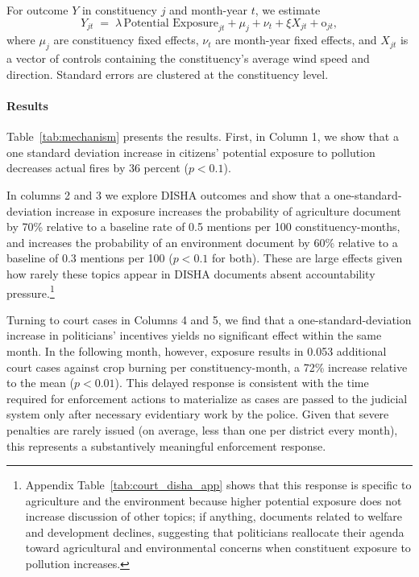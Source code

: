 \documentclass[12pt]{article}
\providecommand{\omicron}{\mathrm{o}}
\begin{document}
For outcome $Y$ in constituency $j$ and month-year $t$, we estimate
\begin{equation}
Y_{jt} \;=\; \lambda \, \text{Potential Exposure}_{jt} + \mu_j + \nu_t + \xi X_{jt} + \omicron_{jt},
\label{eq:mech}
\end{equation}
where $\mu_j$ are constituency fixed effects, $\nu_t$ are month-year fixed effects, and $X_{jt}$ is a vector of controls containing the constituency's average wind speed and direction. Standard errors are clustered at the constituency level.



\paragraph{Results}

Table~\ref{tab:mechanism} presents the results. First, in Column 1, we show that a one standard deviation increase in citizens' potential exposure to pollution decreases actual fires by 36 percent ($p<0.1$). 

In columns 2 and 3 we explore DISHA outcomes and show that a one-standard-deviation increase in exposure increases the probability of agriculture document by 70\% relative to a baseline rate of 0.5 mentions per 100 constituency-months, and increases the probability of an environment document by 60\% relative to a baseline of 0.3 mentions per 100 ($p<0.1$ for both). These are large effects given how rarely these topics appear in DISHA documents absent accountability pressure.\footnote{Appendix Table~\ref{tab:court_disha_app} shows that this response is specific to agriculture and the environment because higher potential exposure does not increase discussion of other topics; if anything, documents related to welfare and development declines, suggesting that politicians reallocate their agenda toward agricultural and environmental concerns when constituent exposure to pollution increases.}

Turning to court cases in Columns 4 and 5, we find that a one-standard-deviation increase in politicians' incentives yields no significant effect within the same month. In the following month, however, exposure results in 0.053 additional court cases against crop burning per constituency-month, a 72\% increase relative to the mean ($p<0.01$). This delayed response is consistent with the time required for enforcement actions to materialize as cases are passed to the judicial system only after necessary evidentiary work by the police. Given that severe penalties are rarely issued (on average, less than one per district every month), this represents a substantively meaningful enforcement response.
\end{document}
